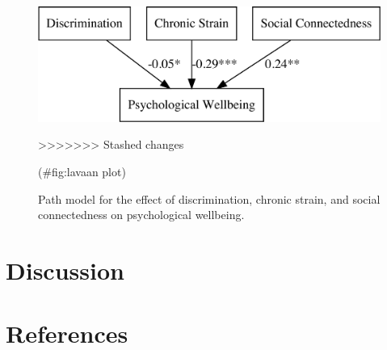 \documentclass[
  english,
  man,floatsintext]{apa6}
\begin{document}
\begin{figure}

{\centering \includegraphics{prep_script_files/figure-latex/lavaan plot-1} 

}

>>>>>>> Stashed changes
\caption{Path model for the effect of discrimination, chronic strain, and social connectedness on psychological wellbeing.}(\#fig:lavaan plot)
\end{figure}

\hypertarget{discussion}{%
\section{Discussion}\label{discussion}}

\newpage

\hypertarget{references}{%
\section{References}\label{references}}

\begingroup
\setlength{\parindent}{-0.5in}
\setlength{\leftskip}{0.5in}
\end{document}
